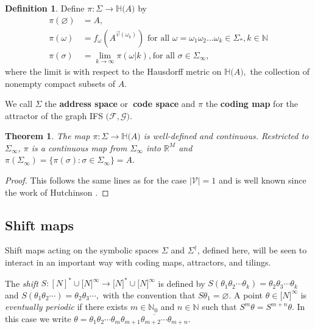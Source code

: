 \documentclass{amsproc}
\newtheorem{theorem}{Theorem}
\theoremstyle{plain}
\theoremstyle{definition}
\newtheorem{definition}{Definition}
\numberwithin{equation}{section}
\begin{document}
\begin{definition}
Define ${\pi}:\Sigma\rightarrow\mathbb{H(}A)$ by%
\begin{align*}
\mathcal{\pi}(\varnothing) & =A, \\
\mathcal{\pi}(\omega) & =f_{\omega}(A^{\overrightarrow{\upsilon}(\omega
_{k})})\text{ for all }\omega=\omega_{1}\omega_{2}...\omega_{k}\in\Sigma
_{\ast},k\in\mathbb{N} \\
\mathcal{\pi}(\sigma) & =\lim_{k\rightarrow\infty}\pi(\omega|k)\text{,}\ 
\text{for all }\sigma\in\Sigma_{\infty},
\end{align*}
where the limit is with respect to the Hausdorff metric on $\mathbb{H(}A),$
the collection of nonempty compact subsets of $A$.
\end{definition}

We call $\Sigma$ the \textbf{address space }or\textbf{\ code space} and $\pi$
the \textbf{coding map} for the attractor of the graph IFS $\mathcal{(F},%
\mathcal{G)}$.

\begin{theorem}
\label{thm:two}The map $\pi:\Sigma\rightarrow\mathbb{H(}A)$ is well-defined
and continuous. Restricted to $\Sigma_{\infty}$, $\pi$ is a continuous map
from $\Sigma_{\infty}$ into $\mathbb{R}^{M}$ and $\pi(\Sigma_{\infty})=\{%
\pi(\sigma):\sigma\in\Sigma_{\infty}\}=A$.
\end{theorem}

\begin{proof}
This follows the same lines as for the case $\left\vert \mathcal{V}%
\right\vert =1$ and is well known since the work of Hutchinson \cite%
{hutchinson}.
\end{proof}

\subsection{Shift maps}

Shift maps acting on the symbolic spaces $\Sigma$ and ${\Sigma}^{\dag}$,
defined here, will be seen to interact in an important way with coding maps,
attractors, and tilings.

The \textit{shift }$S:[N]^{\ast}\cup\lbrack N]^{\infty}\rightarrow\lbrack
N]^{\ast}\cup\lbrack N]^{\infty}$ is defined by $S(\theta_{1}\theta_{2}%
\cdots\theta_{k})=\theta_{2}\theta_{3}\cdots\theta_{k}$ and $S(\theta
_{1}\theta_{2}\cdots)=\theta_{2}\theta_{3}\cdots,$ with the convention that $%
S\theta_{1}=\varnothing$. A point $\theta\in\lbrack N]^{\infty}$ is \textit{%
eventually periodic} if there exists $m\in\mathbb{N}_{0}$ and $n\in\mathbb{N}
$ such that $S^{m}\theta=S^{m+n}\theta$. In this case we write $%
\theta=\theta_{1}\theta_{2}\cdots\theta_{m}\overline{\theta_{m+1}\theta
_{m+2}\cdots\theta_{m+n}}$.
\end{document}
